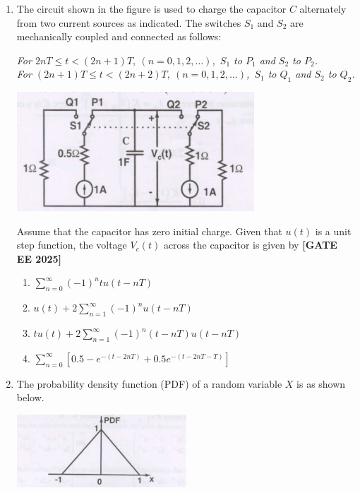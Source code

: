 \documentclass[12pt,a4paper]{article}
\begin{document}
\begin{enumerate}[leftmargin=*, label=\textbf{Q.\arabic*:}]
\item The circuit shown in the figure is used to charge the capacitor $C$ alternately from two current sources as indicated. The switches $S_1$ and $S_2$ are mechanically coupled and connected as follows:

\textit{For $2nT \leq t < (2n+1)T,\ (n=0,1,2,\ldots)$,\ $S_1$ to $P_1$ and $S_2$ to $P_2$.}\\
\textit{For $(2n+1)T \leq t < (2n+2)T,\ (n=0,1,2,\ldots)$,\ $S_1$ to $Q_1$ and $S_2$ to $Q_2$.}
\begin{center}
\includegraphics[width=0.7\textwidth]{figs/q23.png}
\end{center}
Assume that the capacitor has zero initial charge. Given that $u(t)$ is a unit step function, the voltage $V_c(t)$ across the capacitor is given by
\newline
\noindent \textbf{[GATE EE 2025]}
\begin{enumerate}[label=(\Alph*)]
  \item $\displaystyle\sum_{n=0}^\infty (-1)^n t u(t-nT)$
  \item $\displaystyle u(t) + 2 \sum_{n=1}^\infty (-1)^n u(t-nT)$
  \item $\displaystyle t u(t) + 2 \sum_{n=1}^\infty (-1)^n (t-nT)u(t-nT)$
  \item $\displaystyle \sum_{n=0}^\infty \left[ 0.5 - e^{-(t-2nT)} + 0.5e^{-(t-2nT-T)} \right]$
\end{enumerate}

\newpage

\item
The probability density function (PDF) of a random variable $X$ is as shown below.

\begin{center}
\includegraphics[width=0.5\textwidth]{figs/q24a.png}
\end{center}


\end{enumerate}
\end{document}
